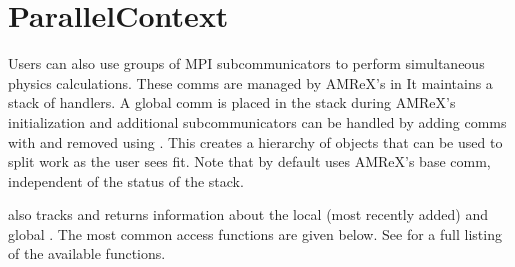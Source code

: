 \documentclass[letterpaper,10pt,english]{sphinxmanual}
\begin{document}
\section{ParallelContext}
\label{\detokenize{Basics:parallelcontext}}
\sphinxAtStartPar
Users can also use groups of MPI subcommunicators to perform
simultaneous physics calculations.  These comms are managed by AMReX’s
 in   It maintains a
stack of  handlers. A global comm is placed in the
 stack during AMReX’s initialization and
additional subcommunicators can be handled by adding comms with
 and removed using .  This creates a
hierarchy of  objects that can be used to split work as
the user sees fit.   Note that  by default uses
AMReX’s base comm, independent of the status of the
 stack.

\sphinxAtStartPar
{} also tracks and returns information about the
local (most recently added) and global .  The most common
access functions are given below.  See  for
a full listing of the available functions.
\begin{quote}
\end{quote}
\end{document}
